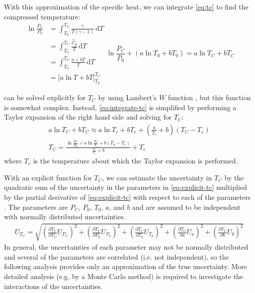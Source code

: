 \documentclass[../main.tex]{subfiles}
\begin{document}
With this approximation of the specific heat, we can integrate \cref{eq:tc}
to find the compressed temperature:
%
\begin{subequations}
\begin{align}
\ln{\frac{P_C}{P_0}}
&= \int_{T_0}^{T_{C}} \! \frac{\gamma}{T\left(\gamma-1\right)} \, \mathrm{d} T \\
&= \int_{T_0}^{T_{C}} \! \frac{\hat{C}_p}{T} \, \mathrm{d} T \\
&= \int_{T_0}^{T_{C}} \! \frac{a + b T}{T} \, \mathrm{d} T\\
&= \Big[a \ln{T} + b T \Big]_{T_0}^{T_C}
\end{align}
\begin{equation}
\ln{\frac{P_C}{P_0}} + \left(a \ln{T_0} + b T_0\right) = a \ln{T_C} + b T_C \label{eq:integrate-tc}
\end{equation}
\end{subequations}

 can be solved explicitly for $T_C$ by using
Lambert's $W$ function \cite{Corless1996}, but this function is somewhat
complex. Instead, \cref{eq:integrate-tc} is simplified by performing a
Taylor expansion of the right hand side and solving for $T_C$:
%
\begin{gather}
a \ln{T_C} + b T_C \approx a \ln{T_e} + bT_e + \left(\frac{a}{T_e} + b\right)\left(T_C - T_e\right) \\
T_C = \frac{\ln{\frac{P_C}{P_0}} + a \ln{\frac{T_0}{T_e}} + b\left(T_0 - T_e\right)}{\frac{a}{T_e}+b} + T_e \label{eq:explicit-tc}
\end{gather}
%
where $T_e$ is the temperature about which the Taylor expansion is performed.

With an explicit function for $T_C$, we can estimate the uncertainty in
$T_C$ by the quadratic sum of the uncertainty in the parameters in
\cref{eq:explicit-tc} multiplied by the partial derivative of
\cref{eq:explicit-tc} with respect to each of the parameters
\cite{Taylor1982}. The parameters are $P_C$, $P_0$, $T_0$, $a$, and $b$
and are assumed to be independent with normally distributed uncertainties.
%
\begin{align}
\label{eq:tc-unc}
U_{T_C} = \sqrt{\left(\frac{\partial T_C}{\partial P_C} U_{P_C}\right)^2 + \left(\frac{\partial T_C}{\partial P_0} U_{P_0}\right)^2 +
                \left(\frac{\partial T_C}{\partial T_0} U_{T_0}\right)^2 + \left(\frac{\partial T_C}{\partial a} U_{a}\right)^2 +
                \left(\frac{\partial T_C}{\partial b} U_{b}\right)^2}
\end{align}
%
In general, the uncertainties of each parameter may not be normally
distributed and several of the parameters are correlated (i.e. not
independent), so the following analysis provides only an approximation
of the true uncertainty. More detailed analysis (e.g. by a Monte Carlo
method) is required to investigate the interactions of the uncertainties.
\end{document}
